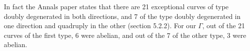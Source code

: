 \documentclass[a4paper]{article}
\begin{document}
  In fact the Annals paper states that there are 21
  exceptional curves of type doubly degenerated in both
  directions, and 7 of the type doubly degenerated in one
  direction and quadruply in the other (section 5.2.2). For
  our $\Gamma$, out of the 21 curves of the first type, 6
  were abelian, and out of the 7 of the other type, 3 were
  abelian.
\end{document}
